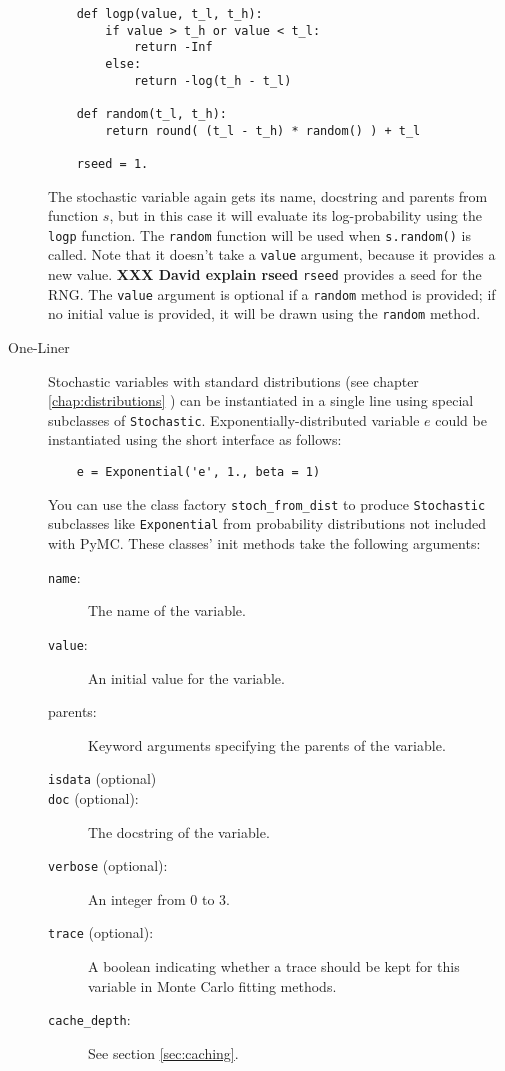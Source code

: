 \begin{description}
\begin{verbatim}
    def logp(value, t_l, t_h):
        if value > t_h or value < t_l:
            return -Inf
        else:
            return -log(t_h - t_l) 
            
    def random(t_l, t_h):
        return round( (t_l - t_h) * random() ) + t_l

    rseed = 1.
    \end{verbatim}
The stochastic variable again gets its name, docstring and parents from function $s$, but in this case it will evaluate its log-probability using the \texttt{logp} function. The \texttt{random} function will be used when \texttt{s.random()} is called. Note that it doesn't take a \texttt{value} argument, because it provides a new value. \textbf{XXX David explain rseed} \texttt{rseed} provides a seed for the RNG. The \texttt{value} argument is optional if a \texttt{random} method is provided; if no initial value is provided, it will be drawn using the \texttt{random} method.

\item[One-Liner] Stochastic variables with standard distributions (see chapter \ref{chap:distributions} ) can be instantiated in a single line using special subclasses of \texttt{Stochastic}. Exponentially-distributed variable $e$ could be instantiated using the short interface as follows:
\begin{verbatim}
    e = Exponential('e', 1., beta = 1)
\end{verbatim}
You can use the class factory \texttt{stoch_from_dist} to produce \texttt{Stochastic} subclasses like \texttt{Exponential} from probability distributions not included with PyMC. These classes' init methods take the following arguments:
\begin{description}
    \item[\texttt{name}:] The name of the variable.
    \item[\texttt{value}:] An initial value for the variable.
    \item[parents:] Keyword arguments specifying the parents of the variable.
    \item[\texttt{isdata} (optional)]
    \item[\texttt{doc} (optional):] The docstring of the variable.
    \item[\texttt{verbose} (optional):] An integer from 0 to 3.
    \item[\texttt{trace} (optional):] A boolean indicating whether a trace should be kept for this variable in Monte Carlo fitting methods.
    \item[\texttt{cache_depth}:] See section \ref{sec:caching}. 
\end{description}



\end{description}
